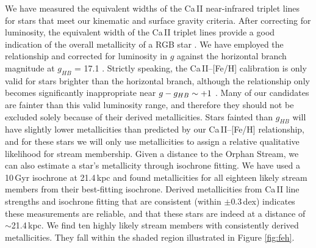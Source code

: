 \documentclass[10pt,apjl]{emulateapj}
\begin{document}
We have measured the equivalent widths of the Ca\,\textsc{II} near-infrared triplet lines for stars that meet our kinematic and surface gravity criteria. After correcting for luminosity, the equivalent width of the Ca\,\textsc{II} triplet lines provide a good indication of the overall metallicity of a RGB star \citep{Amandroff_Da_Costa_1991}. We have employed the \citet{Starkenburg_et-al_2010} relationship and corrected for luminosity in $g$ against the horizontal branch magnitude at $g_{HB}$ = 17.1 \citep{Newberg_et-al_2010}. Strictly speaking, the Ca\,\textsc{II}\---[Fe/H] calibration is only valid for stars brighter than the horizontal branch, although the relationship only becomes significantly inappropriate near $g \-- g_{HB} \sim +1$ \citep{Saviane_et-al_2012}. Many of our candidates are fainter than this valid luminosity range, and therefore they should not be excluded solely because of their derived metallicities. Stars fainted than $g_{HB}$ will have slightly lower metallicities than predicted by our Ca\,\textsc{II}\---[Fe/H] relationship, and for these stars we will only use metallicities to assign a relative qualitative likelihood for stream membership.
Given a distance to the Orphan Stream, we can also estimate a star's metallicity through isochrone fitting. We have used a 10\,Gyr \citet{Girardi_et-al_2008} isochrone at 21.4\,kpc \citep{Newberg_et-al_2010} and found metallicities for all eighteen likely stream members from their best-fitting isochrone. Derived metallicities from Ca\,\textsc{II} line strengths and isochrone fitting that are consistent (within $\pm0.3$\,dex) indicates these measurements are reliable, and that these stars are indeed at a distance of $\sim$21.4\,kpc. We find ten highly likely stream members with consistently derived metallicities. They fall within the shaded region illustrated in Figure \ref{fig:feh}. 
\end{document}
